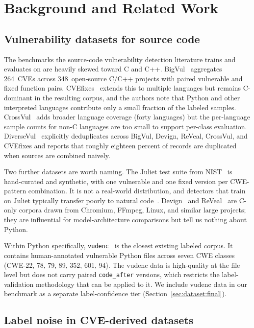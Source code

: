 \section{Background and Related Work}
\label{sec:related}

\subsection{Vulnerability datasets for source code}
\label{sec:related:datasets}

The benchmarks the source-code vulnerability detection literature
trains and evaluates on are heavily skewed toward C and C++.
BigVul~\cite{bigvul} aggregates 264~CVEs across 348~open-source
C/C++ projects with paired vulnerable and fixed function pairs.
CVEfixes~\cite{cvefixes} extends this to multiple languages but
remains C-dominant in the resulting corpus, and the authors note that
Python and other interpreted languages contribute only a small
fraction of the labeled samples. CrossVul~\cite{crossvul} adds
broader language coverage (forty languages) but the per-language
sample counts for non-C languages are too small to support per-class
evaluation. DiverseVul~\cite{diversevul} explicitly deduplicates
across BigVul, Devign, ReVeal, CrossVul, and CVEfixes and reports that
roughly eighteen percent of records are duplicated when sources are
combined naively.

Two further datasets are worth naming. The Juliet test suite from
NIST~\cite{juliet} is hand-curated and synthetic, with one
vulnerable and one fixed version per CWE-pattern combination. It is
not a real-world distribution, and detectors that train on Juliet
typically transfer poorly to natural code~\cite{reveal}.
Devign~\cite{devign} and ReVeal~\cite{reveal} are C-only
corpora drawn from Chromium, FFmpeg, Linux, and similar large
projects; they are influential for model-architecture comparisons
but tell us nothing about Python.

Within Python specifically, \texttt{vudenc}~\cite{vudenc} is the
closest existing labeled corpus. It contains human-annotated
vulnerable Python files across seven CWE classes (CWE-22, 78, 79, 89,
352, 601, 94). The vudenc data is high-quality at the file level but
does not carry paired \texttt{code\_after} versions, which restricts
the label-validation methodology that can be applied to it. We
include vudenc data in our benchmark as a separate label-confidence
tier (Section~\ref{sec:dataset:final}).

\subsection{Label noise in CVE-derived datasets}
\label{sec:related:labelnoise}

